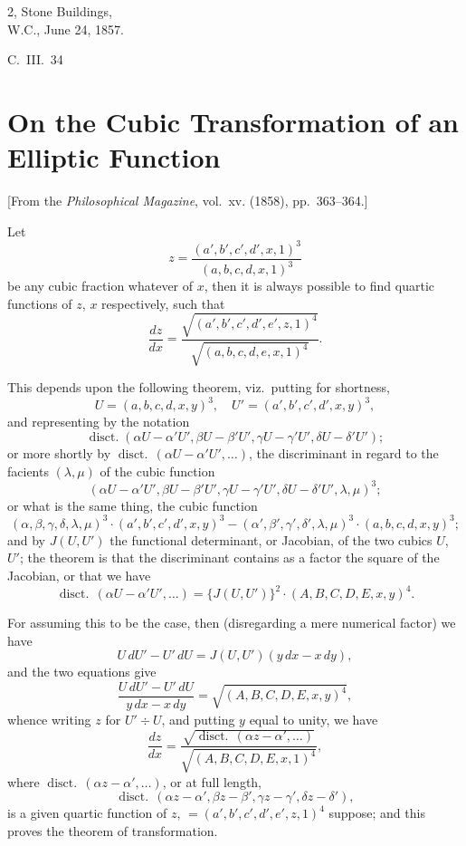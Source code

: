 \documentclass[11pt,a4paper]{book}
\providecommand{\between}{,}
\begin{document}
{{\begin{flushright}
2, Stone Buildings,\\
W.C., June 24, 1857.
\end{flushright}
\hfill C.~III.~34
\newpage


\section{On the Cubic Transformation of an Elliptic Function}
\label{sec:210}

[From the \textit{Philosophical Magazine}, vol.~xv. (1858), pp.~363--364.]
\vspace{1em}

Let
\[
z = \frac{(a', b', c', d' \between x, 1)^3}{(a, b, c, d \between x, 1)^3}
\]
be any cubic fraction whatever of $x$, then it is always possible to find quartic functions of $z$, $x$ respectively, such that
\[
\frac{dz}{dx} = \frac{\sqrt{(a', b', c', d', e' \between z, 1)^4}}{\sqrt{(a, b, c, d, e \between x, 1)^4}}.
\]

This depends upon the following theorem, viz.\ putting for shortness,
\[
U = (a, b, c, d \between x, y)^3, \quad U' = (a', b', c', d' \between x, y)^3,
\]
and representing by the notation
\[
\operatorname{disct.} (\alpha U - \alpha' U', \beta U - \beta' U', \gamma U - \gamma' U', \delta U - \delta' U');
\]
or more shortly by $\operatorname{disct.}\,(\alpha U - \alpha' U', \ldots)$, the discriminant in regard to the facients $(\lambda, \mu)$ of the cubic function
\[
(\alpha U - \alpha' U', \beta U - \beta' U', \gamma U - \gamma' U', \delta U - \delta' U' \between \lambda, \mu)^3;
\]
or what is the same thing, the cubic function
\[
(\alpha, \beta, \gamma, \delta \between \lambda, \mu)^3 \cdot (a', b', c', d' \between x, y)^3 - (\alpha', \beta', \gamma', \delta' \between \lambda, \mu)^3 \cdot (a, b, c, d \between x, y)^3;
\]
and by $J(U, U')$ the functional determinant, or Jacobian, of the two cubics $U$, $U'$; the theorem is that the discriminant contains as a factor the square of the Jacobian, or that we have
\[
\operatorname{disct.}\,(\alpha U - \alpha' U', \ldots) = \{J(U, U')\}^2 \cdot (A, B, C, D, E \between x, y)^4.
\]

For assuming this to be the case, then (disregarding a mere numerical factor) we have
\[
U\,dU' - U'\,dU = J(U, U')(y\,dx - x\,dy),
\]
and the two equations give
\[
\frac{U\,dU' - U'\,dU}{y\,dx - x\,dy} = \sqrt{(A, B, C, D, E \between x, y)^4},
\]
whence writing $z$ for $U' \div U$, and putting $y$ equal to unity, we have
\[
\frac{dz}{dx} = \frac{\sqrt{\operatorname{disct.}\,(\alpha z - \alpha', \ldots)}}{\sqrt{(A, B, C, D, E \between x, 1)^4}},
\]
where $\operatorname{disct.}\,(\alpha z - \alpha', \ldots)$, or at full length,
\[
\operatorname{disct.}\,(\alpha z - \alpha', \beta z - \beta', \gamma z - \gamma', \delta z - \delta'),
\]
is a given quartic function of $z$, $= (a', b', c', d', e' \between z, 1)^4$ suppose; and this proves the theorem of transformation.

}}
\end{document}
